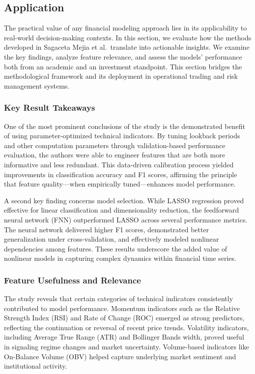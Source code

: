 \subsection{Application}

The practical value of any financial modeling approach lies in its applicability to real-world decision-making contexts. In this section, we evaluate how the methods developed in Sagaceta Mejia et al.\ translate into actionable insights. We examine the key findings, analyze feature relevance, and assess the models’ performance both from an academic and an investment standpoint. This section bridges the methodological framework and its deployment in operational trading and risk management systems.

\subsubsection{Key Result Takeaways}

One of the most prominent conclusions of the study is the demonstrated benefit of using parameter-optimized technical indicators. By tuning lookback periods and other computation parameters through validation-based performance evaluation, the authors were able to engineer features that are both more informative and less redundant. This data-driven calibration process yielded improvements in classification accuracy and F1 scores, affirming the principle that feature quality—when empirically tuned—enhances model performance.

A second key finding concerns model selection. While LASSO regression proved effective for linear classification and dimensionality reduction, the feedforward neural network (FNN) outperformed LASSO across several performance metrics. The neural network delivered higher F1 scores, demonstrated better generalization under cross-validation, and effectively modeled nonlinear dependencies among features. These results underscore the added value of nonlinear models in capturing complex dynamics within financial time series.

\subsubsection{Feature Usefulness and Relevance}

The study reveals that certain categories of technical indicators consistently contributed to model performance. Momentum indicators such as the Relative Strength Index (RSI) and Rate of Change (ROC) emerged as strong predictors, reflecting the continuation or reversal of recent price trends. Volatility indicators, including Average True Range (ATR) and Bollinger Bands width, proved useful in signaling regime changes and market uncertainty. Volume-based indicators like On-Balance Volume (OBV) helped capture underlying market sentiment and institutional activity.

